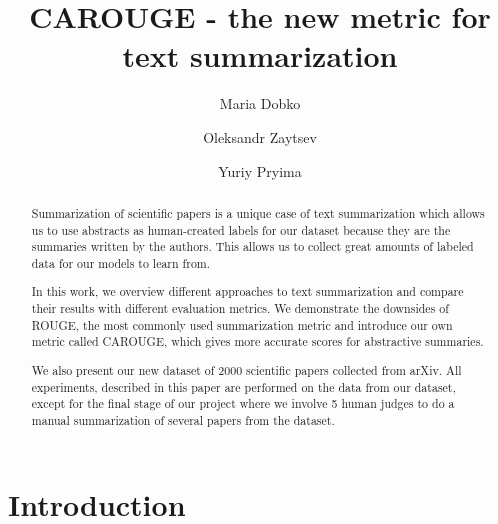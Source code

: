 \documentclass[sigplan]{acmart}
\begin{document}
\title{CAROUGE - the new metric for text summarization}

\author{Maria Dobko}

\author{Oleksandr Zaytsev}

\author{Yuriy Pryima}

\begin{abstract}

Summarization of scientific papers is a unique case of text summarization which allows us to use abstracts as human-created labels for our dataset because they are the summaries written by the authors. This allows us to collect great amounts of labeled data for our models to learn from.
 
In this work, we overview different approaches to text summarization and compare their results with different evaluation metrics. We demonstrate the downsides of ROUGE, the most commonly used summarization metric and introduce our own metric called CAROUGE, which gives more accurate scores for abstractive summaries.

We also present our new dataset of 2000 scientific papers collected from arXiv. All experiments, described in this paper are performed on the data from our dataset, except for the final stage of our project where we involve 5 human judges to do a manual summarization of several papers from the dataset.

\end{abstract}


\maketitle

\section{Introduction}
\end{document}
